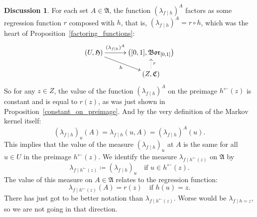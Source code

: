 \documentclass[
twoside=true,
paper=letter,
fontsize=11pt,
pagesize=auto,
leqno,
openany,
headsepline,
overfullrule,
]{scrbook}
\theoremstyle{plain}
\theoremstyle{plain}
\theoremstyle{definition}
\newtheorem{discussion}[thm]{Discussion}
\theoremstyle{bfnoteitalic}
\theoremstyle{bfnoteroman}
\newcommand{\sigalg}[1]{\mathfrak{#1}}
\newcommand{\definedby}{\coloneqq}
\newcommand{\borel}{\mathfrak{Bor}}
\newcommand{\preimage}[1]{#1^{\leftarrow}}
\newcommand{\sigmaalgebra}{\sigalg{A}}
\newcommand{\sigmaalgebraiii}{\sigalg{C}}
\newcommand{\function}{f}
\newcommand{\functioniii}{h}
\newcommand{\measurespaceiii}{Z}
\newcommand{\mspaceeltiii}{z}
\newcommand{\measureiii}{\lambda}
\newcommand{\seti}{A}
\newcommand{\mkernel}[3]{#1_{#2\mid#3}}
\newcommand{\uspace}{U}%
\newcommand{\uspaceelt}{u}
\begin{document}
\begin{discussion}
For each set $\seti\in\sigmaalgebra$, the function 
$(\mkernel{\measureiii}{\function}{\functioniii})^\seti$ factors as some regression function $r$ composed with $\functioniii$,
that is, $(\mkernel{\measureiii}{\function}{\functioniii})^\seti= r \circ \functioniii$,
which was the heart of Proposition~\ref{factoring_functions}:
\[
\xymatrix@R=14pt@C=30pt{
(\uspace,\sigalg{H}) 
\ar[r]^-{(\mkernel{\measureiii}{\function}{\functioniii})^\seti} 
\ar[dr]_{\functioniii}
& \bigl([0,1],\borel_{[0,1]}\bigr) \\
 & (\measurespaceiii,\sigmaalgebraiii) \ar@{.>}[u]_{r}\\
}
\]
So for any $\mspaceeltiii \in\measurespaceiii$, the value of the function
$(\mkernel{\measureiii}{\function}{\functioniii})^\seti$ 
on the preimage 
$\preimage{\functioniii}(\mspaceeltiii)$
is constant and is equal to $r(\mspaceeltiii)$, as was just shown in Proposition~\ref{constant_on_preimage}.
And by the very definition of the Markov kernel itself:  
\[
(\mkernel{\measureiii}{\function}{\functioniii})_\uspaceelt (\seti)
= \mkernel{\measureiii}{\function}{\functioniii}(\uspaceelt,\seti)
= (\mkernel{\measureiii}{\function}{\functioniii})^\seti(\uspaceelt).
\]
This implies  that the value of the measure
$(\mkernel{\measureiii}{\function}{\functioniii})_\uspaceelt$ 
at $\seti$ is the same for all 
$\uspaceelt\in\uspace$ in the preimage $\preimage{\functioniii}(\mspaceeltiii)$.
We identify the measure
$\mkernel{\measureiii}{\function}{\preimage{\functioniii}(\mspaceeltiii)}$ on $\sigmaalgebra$ by
\[
\mkernel{\measureiii}{\function}{\preimage{\functioniii}(\mspaceeltiii)}
\definedby
(\mkernel{\measureiii}{\function}{\functioniii})_\uspaceelt
\quad\text{if $\uspaceelt\in\preimage{\functioniii}(\mspaceeltiii)$}.
\] 
The value of this measure on $\seti\in\sigmaalgebra$ relates to the regression function:
\[
\mkernel{\measureiii}{\function}{\preimage{\functioniii}(\mspaceeltiii)}(\seti)
=
r(\mspaceeltiii)
\quad\text{if $\functioniii(\uspaceelt) = \mspaceeltiii$}.
\]
There has just got to be better notation than 
$\mkernel{\measureiii}{\function}{\preimage{\functioniii}(\mspaceeltiii)}$.
Worse would be 
$\mkernel{\measureiii}{\function}{\functioniii = \mspaceeltiii}$, 
so we are not going in that direction.
\end{discussion}
\end{document}
